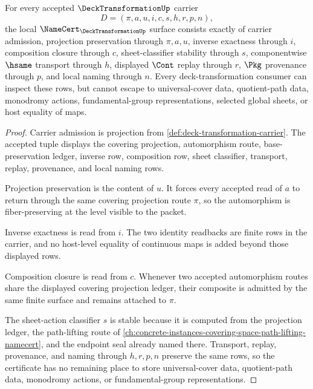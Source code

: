 \begin{theorem}
\label{thm:deck-transformation-namecert-obligations}
For every accepted $\DeckTransformationUp$ carrier
$$
D=(\pi,a,u,i,c,s,h,r,p,n),
$$
the local $\NameCert_{\DeckTransformationUp}$ surface consists exactly of carrier admission, projection preservation through $\pi,a,u$, inverse exactness through $i$, composition closure through $c$, sheet-classifier stability through $s$, componentwise $\hsame$ transport through $h$, displayed $\Cont$ replay through $r$, $\Pkg$ provenance through $p$, and local naming through $n$. Every deck-transformation consumer can inspect these rows, but cannot escape to universal-cover data, quotient-path data, monodromy actions, fundamental-group representations, selected global sheets, or host equality of maps.
\end{theorem}
\begin{proof}
Carrier admission is projection from \autoref{def:deck-transformation-carrier}. The accepted tuple displays the covering projection, automorphism route, base-preservation ledger, inverse row, composition row, sheet classifier, transport, replay, provenance, and local naming rows.

Projection preservation is the content of $u$. It forces every accepted read of $a$ to return through the same covering projection route $\pi$, so the automorphism is fiber-preserving at the level visible to the packet.

Inverse exactness is read from $i$. The two identity readbacks are finite rows in the carrier, and no host-level equality of continuous maps is added beyond those displayed rows.

Composition closure is read from $c$. Whenever two accepted automorphism routes share the displayed covering projection ledger, their composite is admitted by the same finite surface and remains attached to $\pi$.

The sheet-action classifier $s$ is stable because it is computed from the projection ledger, the path-lifting route of \autoref{ch:concrete-instances-covering-space-path-lifting-namecert}, and the endpoint seal already named there. Transport, replay, provenance, and naming through $h,r,p,n$ preserve the same rows, so the certificate has no remaining place to store universal-cover data, quotient-path data, monodromy actions, or fundamental-group representations.
\end{proof}


